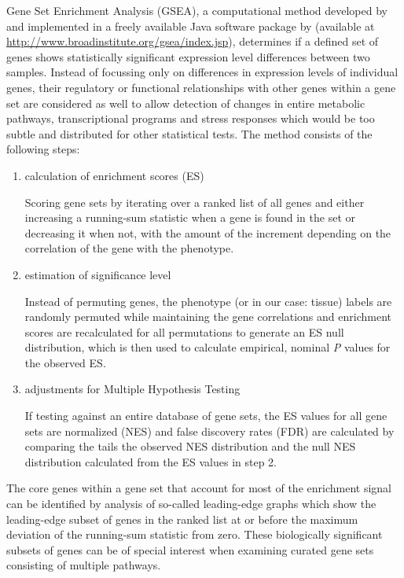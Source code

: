   Gene Set Enrichment Analysis (GSEA), a computational method developed by
\cite{Mootha2003} and implemented in a freely available Java software package by
\cite{Subramanian2005} (available at
\url{http://www.broadinstitute.org/gsea/index.jsp}), determines if a defined set
of genes shows statistically significant expression level differences between
two samples. Instead of focussing only on differences in expression levels of
individual genes, their regulatory or functional relationships with other genes
within a gene set are considered as well to allow detection of changes in entire
metabolic pathways, transcriptional programs and stress responses which would be
too subtle and distributed for other statistical tests. The method consists of
the following steps:
  \begin{enumerate}
   \item calculation of enrichment scores (ES)
   
   Scoring gene sets by iterating over a ranked list of all genes and either
increasing a running-sum statistic when a gene is found in the set or decreasing
it when not, with the amount of the increment depending on the correlation of
the gene with the phenotype.
   
   \item estimation of significance level
   
   Instead of permuting genes, the phenotype (or in our case: tissue) labels are
randomly permuted while maintaining the gene correlations and enrichment scores
are recalculated for all permutations to generate an ES null distribution, which
is then used to calculate empirical, nominal \textit{P} values for the observed
ES.
   
   \item adjustments for Multiple Hypothesis Testing
   
   If testing against an entire database of gene sets, the ES values for all
gene sets are normalized (NES) and false discovery rates (FDR) are calculated by
comparing the tails the observed NES distribution and the null NES distribution
calculated from the ES values in step 2.
  \end{enumerate}
  
  The core genes within a gene set that account for most of the enrichment
signal can be identified by analysis of so-called leading-edge graphs which show
the leading-edge subset of genes in the ranked list at or before the maximum
deviation of the running-sum statistic from zero. These biologically significant
subsets of genes can be of special interest when examining curated gene sets
consisting of multiple pathways.
  
